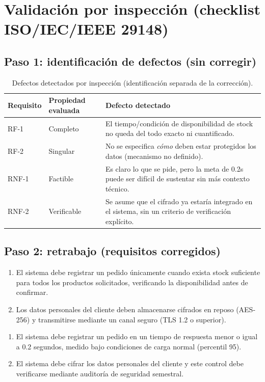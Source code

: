 \documentclass[11pt,a4paper]{article}
\begin{document}
\FloatBarrier

\section{Validación por inspección (checklist ISO/IEC/IEEE 29148)}

\subsection*{Paso 1: identificación de defectos (sin corregir)}
\begin{table}[H]
\centering
\begin{tabular}{l l L{9cm}}
\toprule
\textbf{Requisito} & \textbf{Propiedad evaluada} & \textbf{Defecto detectado} \\
\midrule
RF-1  & Completo   & El tiempo/condición de disponibilidad de stock no queda del todo exacto ni cuantificado. \\
RF-2  & Singular   & No se especifica \emph{cómo} deben estar protegidos los datos (mecanismo no definido). \\
RNF-1 & Factible   & Es claro lo que se pide, pero la meta de 0.2s puede ser difícil de sustentar sin más contexto técnico. \\
RNF-2 & Verificable & Se asume que el cifrado ya estaría integrado en el sistema, sin un criterio de verificación explícito. \\
\bottomrule
\end{tabular}
\caption{Defectos detectados por inspección (identificación separada de la corrección).}
\end{table}

\subsection*{Paso 2: retrabajo (requisitos corregidos)}
\begin{enumerate}[label=\textbf{RF-\arabic*'}]
    \item El sistema debe registrar un pedido únicamente cuando exista stock suficiente para todos los productos solicitados, verificando la disponibilidad antes de confirmar.
    \item Los datos personales del cliente deben almacenarse cifrados en reposo (AES-256) y transmitirse mediante un canal seguro (TLS 1.2 o superior).
\end{enumerate}
\begin{enumerate}[label=\textbf{RNF-\arabic*'}]
    \item El sistema debe registrar un pedido en un tiempo de respuesta menor o igual a 0.2 segundos, medido bajo condiciones de carga normal (percentil 95).
    \item El sistema debe cifrar los datos personales del cliente y este control debe verificarse mediante auditoría de seguridad semestral.
\end{enumerate}
\end{document}
